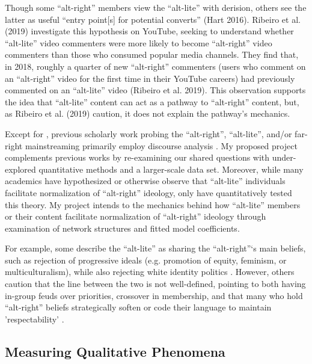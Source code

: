 \documentclass[acmlarge, screen, authorversion]{acmart}
\begin{document}
Though some “alt-right” members view the “alt-lite” with derision,
others see the latter as useful “entry point[s] for potential converts”
(Hart 2016). Ribeiro et al. (2019) investigate this hypothesis on
YouTube, seeking to understand whether “alt-lite” video commenters were
more likely to become “alt-right” video commenters than those who
consumed popular media channels. They find that, in 2018, roughly a
quarter of new “alt-right” commenters (users who comment on an
“alt-right” video for the first time in their YouTube careers) had
previously commented on an “alt-lite” video (Ribeiro et al. 2019). This
observation supports the idea that “alt-lite” content can act as a
pathway to “alt-right” content, but, as Ribeiro et al. (2019) caution,
it does not explain the pathway’s mechanics.

Except for \citet{ribeiroAuditingRadicalizationPathways2019}, previous scholarly work probing the
“alt-right”, “alt-lite”, and/or far-right mainstreaming
primarily employ discourse analysis \cite{cammaertsMainstreamingExtremeRightWing2018, gallaherMainstreamingWhiteSupremacy2020, lorenzo-dusDiscourseUSAltright2020, fergusWhitegenocideAltrightConspiracy2019}. My proposed project
complements previous works by re-examining our shared questions with
under-explored quantitative methods and a larger-scale data set. Moreover,
while many academics \cite{sternProudBoysWhite2019, nagleKillAllNormies2017, mainRiseAltRight2018} have hypothesized or otherwise observe that “alt-lite”
individuals facilitate normalization of “alt-right” ideology, only
\citet{ribeiroAuditingRadicalizationPathways2019} have quantitatively tested this theory. My
project intends to the mechanics behind how “alt-lite” members or their
content facilitate normalization of “alt-right” ideology through
examination of network structures and fitted model coefficients.

 For example, some describe the ``alt-lite” as
sharing the ``alt-right''‘s main beliefs, such as rejection of progressive
ideals (e.g. promotion of equity, feminism, or multiculturalism), while also rejecting white identity politics \cite{mainRiseAltRight2018, hawleyAltRightWhatEveryone2018}. However, others
caution that the line between the two is not well-defined, pointing to both
having in-group feuds over priorities, crossover in membership, and that
many who  hold “alt-right” beliefs strategically soften or code their language to maintain 'respectability' \cite{anti-defamationleagueAltRightAlt, sternProudBoysWhite2019}.

\subsection{Measuring Qualitative Phenomena}
\end{document}
